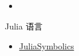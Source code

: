 
\begin{issues}
\issueDraft
\end{issues}

\begin{itemize}
\item 
\end{itemize}

Julia 语言
\begin{itemize}
\item \href{https://juliasymbolics.org/}{JuliaSymbolics}
\end{itemize}
